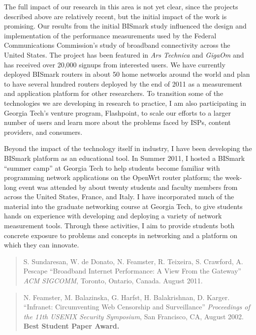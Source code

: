 The full impact of our research in this area is not yet clear, since the
projects described above are relatively recent, but the initial impact
of the work is promising.  Our results from the initial BISmark study
influenced the design and implementation of the performance measurements
used by the Federal Communications Commission's study of broadband
connectivity across the United States.  The project has been featured in
{\em Ars Technica} and {\em GigaOm} and has received over 20,000 signups
from interested users.  We have currently deployed BISmark routers in
about 50 home networks around the world and plan to have several hundred
routers deployed by the end of 2011 as a measurement and application
platform for other researchers.  To transition some of the technologies
we are developing in research to practice, I am also participating in
Georgia Tech's venture program, Flashpoint, to scale our efforts to a
larger number of users and learn more about the problems faced by ISPs,
content providers, and consumers.

Beyond the impact of the technology itself in industry, I have been
developing the BISmark platform as an educational tool.  In Summer 2011,
I hosted a BISmark ``summer camp'' at Georgia Tech to help students
become familiar with programming network applications on the OpenWrt
router platform; the week-long event was attended by about twenty
students and faculty members from across the United States, France, and
Italy.  I have incorporated much of the material into the graduate
networking course at Georgia Tech, to give students hands on experience
with developing and deploying a variety of network measurement tools.
Through these activities, I aim to provide students both concrete
exposure to problems and concepts in networking and a platform on which
they can innovate.


\begin{quote}
S. Sundaresan, W. de Donato, N. Feamster, R. Teixeira, S. Crawford, A. Pescape 
``Broadband Internet Performance: A View From the Gateway''
{\em ACM SIGCOMM}, Toronto, Ontario, Canada. August 2011. 
\end{quote}

\begin{quote}
N. Feamster, M. Balazinska, G. Harfst, H. Balakrishnan, D. Karger.
``Infranet: Circumventing Web Censorship and Surveillance''
{\em Proceedings of the 11th USENIX Security Symposium}, San Francisco,
CA, August 2002.  {\bf Best Student Paper Award.}
\end{quote}
